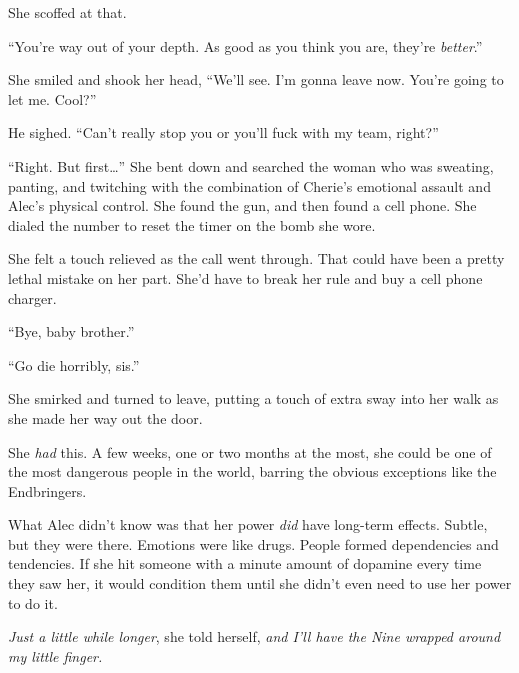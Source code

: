 She scoffed at that.



``You're way out of your depth.  As good as you think you are, they're \emph{better}.''



She smiled and shook her head, ``We'll see.  I'm gonna leave now.  You're going to let me.  Cool?''



He sighed.  ``Can't really stop you or you'll fuck with my team, right?''



``Right.  But first\ldots''  She bent down and searched the woman who was sweating, panting, and twitching with the combination of Cherie's emotional assault and Alec's physical control.  She found the gun, and then found a cell phone.  She dialed the number to reset the timer on the bomb she wore.



She felt a touch relieved as the call went through.  That could have been a pretty lethal mistake on her part.  She'd have to break her rule and buy a cell phone charger.



``Bye, baby brother.''



``Go die horribly, sis.''



She smirked and turned to leave, putting a touch of extra sway into her walk as she made her way out the door.



She \emph{had} this.  A few weeks, one or two months at the most, she could be one of the most dangerous people in the world, barring the obvious exceptions like the Endbringers.



What Alec didn't know was that her power \emph{did }have long-term effects.  Subtle, but they were there.  Emotions were like drugs.  People formed dependencies and tendencies.  If she hit someone with a minute amount of dopamine every time they saw her, it would condition them until she didn't even need to use her power to do it.



\emph{Just a little while longer}, she told herself, \emph{and I'll have the Nine wrapped around my little finger.}





